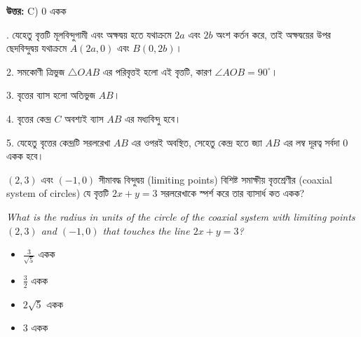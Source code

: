 \documentclass[12pt, a4paper]{article}
\begin{document}
\vspace{0.5em}
\begin{tcolorbox}[answerbox]
    \textbf{\color{success} উত্তর:} C) $0$ একক
\end{tcolorbox}
\vspace{1em}

\begin{tcolorbox}[solutionbox={সমাধান (Solution)}]
    . যেহেতু বৃত্তটি মূলবিন্দুগামী এবং অক্ষদ্বয় হতে যথাক্রমে $2a$ এবং $2b$ অংশ কর্তন করে, তাই অক্ষদ্বয়ের উপর ছেদবিন্দুদ্বয় যথাক্রমে $A(2a, 0)$ এবং $B(0, 2b)$।
    
    \vspace{0.5em}
    2. সমকোণী ত্রিভুজ $\triangle OAB$ এর পরিবৃত্তই হলো এই বৃত্তটি, কারণ $\angle AOB = 90^{\circ}$।
    
    3. বৃত্তের ব্যাস হলো অতিভুজ $AB$।
    
    4. বৃত্তের কেন্দ্র $C$ অবশ্যই ব্যাস $AB$ এর মধ্যবিন্দু হবে।
    
    5. যেহেতু বৃত্তের কেন্দ্রটি সরলরেখা $AB$ এর ওপরই অবস্থিত, সেহেতু কেন্দ্র হতে জ্যা $AB$ এর লম্ব দূরত্ব সর্বদা $0$ একক হবে।
\end{tcolorbox}

\begin{tcolorbox}[questionbox={প্রশ্ন (Question) 19}]
    \noindent
    $(2, 3)$ এবং $(-1, 0)$ সীমাবদ্ধ বিন্দুদ্বয় (limiting points) বিশিষ্ট সমাক্ষীয় বৃত্তশ্রেণীর (coaxial system of circles) যে বৃত্তটি $2x + y = 3$ সরলরেখাকে স্পর্শ করে তার ব্যাসার্ধ কত একক?
    
    \vspace{0.8em}
    \begin{english}
    \noindent\textit{\color{darkgray}
    What is the radius in units of the circle of the coaxial system with limiting points $(2, 3)$ and $(-1, 0)$ that touches the line $2x + y = 3$?
    }
    \end{english}
\end{tcolorbox}

\begin{itemize}[label={}, leftmargin=1cm, itemsep=0.5em]
    \item[\textbf{A)}] $\frac{3}{\sqrt{5}}$ একক
    \item[\textbf{B)}] $\frac{3}{2}$ একক
    \item[\textbf{C)}] $2\sqrt{5}$ একক
    \item[\textbf{D)}] $3$ একক
\end{itemize}
\end{document}
